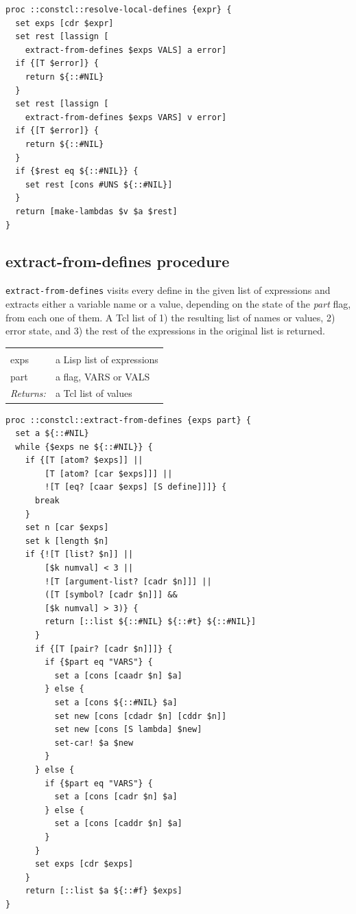 \documentclass[a5paper,draft]{memoir}
\begin{document}
\begin{lstlisting}
proc ::constcl::resolve-local-defines {expr} {
  set exps [cdr $expr]
  set rest [lassign [
    extract-from-defines $exps VALS] a error]
  if {[T $error]} {
    return ${::#NIL}
  }
  set rest [lassign [
    extract-from-defines $exps VARS] v error]
  if {[T $error]} {
    return ${::#NIL}
  }
  if {$rest eq ${::#NIL}} {
    set rest [cons #UNS ${::#NIL}]
  }
  return [make-lambdas $v $a $rest]
}
\end{lstlisting}

\subsection{extract-from-defines procedure}
\label{extractfromdefines-procedure}

\texttt{extract-from-defines} visits every define in the given list of expressions and extracts either a variable name or a value, depending on the state of the \emph{part} flag, from each one of them. A Tcl list of 1) the resulting list of names or values, 2) error state, and 3) the rest of the expressions in the original list is returned.

\noindent\begin{tabular}{ |p{1.9cm} p{6.5cm}| }
\hline
\rowcolor[HTML]{CCCCCC} \multicolumn{2}{|l|}{\textbf{extract-from-defines (internal)}} \\
exps & a Lisp list of expressions \\
part & a flag, VARS or VALS \\
\textit{Returns:} & a Tcl list of values \\
\hline
\end{tabular}

\begin{lstlisting}
proc ::constcl::extract-from-defines {exps part} {
  set a ${::#NIL}
  while {$exps ne ${::#NIL}} {
    if {[T [atom? $exps]] ||
        [T [atom? [car $exps]]] ||
        ![T [eq? [caar $exps] [S define]]]} {
      break
    }
    set n [car $exps]
    set k [length $n]
    if {![T [list? $n]] ||
        [$k numval] < 3 ||
        ![T [argument-list? [cadr $n]]] ||
        ([T [symbol? [cadr $n]]] &&
        [$k numval] > 3)} {
        return [::list ${::#NIL} ${::#t} ${::#NIL}]
      }
      if {[T [pair? [cadr $n]]]} {
        if {$part eq "VARS"} {
          set a [cons [caadr $n] $a]
        } else {
          set a [cons ${::#NIL} $a]
          set new [cons [cdadr $n] [cddr $n]]
          set new [cons [S lambda] $new]
          set-car! $a $new
        }
      } else {
        if {$part eq "VARS"} {
          set a [cons [cadr $n] $a]
        } else {
          set a [cons [caddr $n] $a]
        }
      }
      set exps [cdr $exps]
    }
    return [::list $a ${::#f} $exps]
}
\end{lstlisting}
\end{document}
